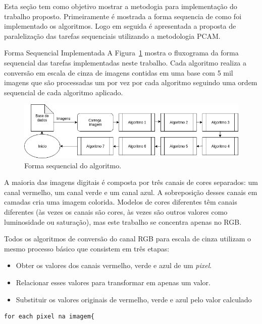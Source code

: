 Esta seção tem como objetivo mostrar a metodogia para implementação do trabalho
proposto. Primeiramente é mostrada a forma sequencia de como foi implementado os
algoritmos. Logo em seguida é apresentada a proposta de paralelização das tarefas
sequenciais utilizando a metodologia PCAM.

\begin{subsection}{Forma Sequencial Implementada}
A Figura~\ref{fig:gray} mostra o fluxograma da forma sequencial das tarefas
implementadas neste trabalho. Cada algoritmo realiza a conversão em escala de
cinza de imagens contidas em uma base com 5 mil imagens que são processadas um
por vez por cada algoritmo seguindo uma ordem sequencial de cada algoritmo
aplicado.  

\begin{figure}[!h]
	\centering
	\includegraphics[width=0.95\linewidth]{figs/Sequential.png}
	\caption{Forma sequencial do algoritmo.}
	\label{fig:gray}
\end{figure}



A maioria das imagens digitais é composta por três canais de cores separados: um
canal vermelho, um canal verde e um canal azul. A sobreposição desses canais em
camadas cria uma imagem colorida. Modelos de cores diferentes têm canais
diferentes (às vezes os canais são cores, às vezes são outros valores como
luminosidade ou saturação), mas este trabalho se concentra apenas no RGB.

Todos os algoritmos de conversão do canal RGB para escala de cinza utilizam 
o mesmo processo básico que consistem em três etapas:

\begin{itemize}
\item Obter os valores dos canais vermelho, verde e azul de um \textit{pixel}.
\item Relacionar esses valores para transformar em apenas um valor.
\item Substituir os valores originais de vermelho, verde e azul pelo valor calculado
\end{itemize}


\begin{lstlisting}
for each pixel na imagem{


\end{lstlisting}
\end{subsection}
